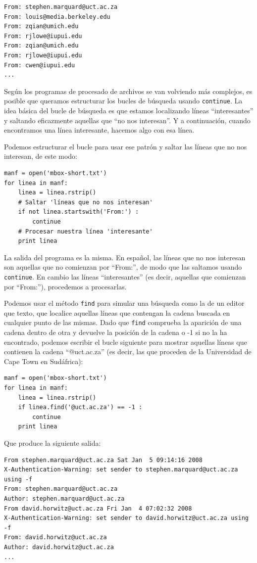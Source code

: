 \beforeverb
\begin{verbatim}
From: stephen.marquard@uct.ac.za
From: louis@media.berkeley.edu
From: zqian@umich.edu
From: rjlowe@iupui.edu
From: zqian@umich.edu
From: rjlowe@iupui.edu
From: cwen@iupui.edu
...
\end{verbatim}
\afterverb
%
Según los programas de procesado de archivos se van volviendo más complejos, es posible
que queramos estructurar los bucles de búsqueda usando {\tt continue}. La idea básica
del bucle de búsqueda es que estamos localizando líneas ``interesantes''
y saltando eficazmente aquellas que ``no nos interesan''. Y a continuación, cuando
encontramos una línea interesante, hacemos algo con esa línea.

Podemos estructurar el bucle para usar ese
patrón y saltar las líneas que no nos interesan, de este modo:

\beforeverb
\begin{verbatim}
manf = open('mbox-short.txt')
for linea in manf:
    linea = linea.rstrip()
    # Saltar 'líneas que no nos interesan'
    if not linea.startswith('From:') :
        continue
    # Procesar nuestra línea 'interesante'
    print linea
\end{verbatim}
\afterverb
%
La salida del programa es la misma. En español, las
líneas que no nos interesan son aquellas que no comienzan
por ``From:'', de modo que las saltamos usando {\tt continue}.
En cambio las líneas ``interesantes'' (es decir, aquellas que comienzan por ``From:''),
procedemos a procesarlas.

Podemos usar el método {\tt find} para simular una búsqueda como la de
un editor que texto, que localice aquellas líneas que contengan la cadena buscada
en cualquier punto de las mismas.
Dado que {\tt find} comprueba la aparición de una cadena dentro de otra
y devuelve la posición de la cadena o -1 si no la ha encontrado,
podemos escribir el bucle siguiente para mostrar aquellas líneas
que contienen la cadena ``@uct.ac.za'' (es decir, las que proceden de la Universidad
de Cape Town en Sudáfrica):

\beforeverb
\begin{verbatim}
manf = open('mbox-short.txt')
for linea in manf:
    linea = linea.rstrip()
    if linea.find('@uct.ac.za') == -1 : 
        continue
    print linea
\end{verbatim}
\afterverb
%
Que produce la siguiente salida:

\beforeverb
\begin{verbatim}
From stephen.marquard@uct.ac.za Sat Jan  5 09:14:16 2008
X-Authentication-Warning: set sender to stephen.marquard@uct.ac.za using -f
From: stephen.marquard@uct.ac.za
Author: stephen.marquard@uct.ac.za
From david.horwitz@uct.ac.za Fri Jan  4 07:02:32 2008
X-Authentication-Warning: set sender to david.horwitz@uct.ac.za using -f
From: david.horwitz@uct.ac.za
Author: david.horwitz@uct.ac.za
...
\end{verbatim}
\afterverb
%

